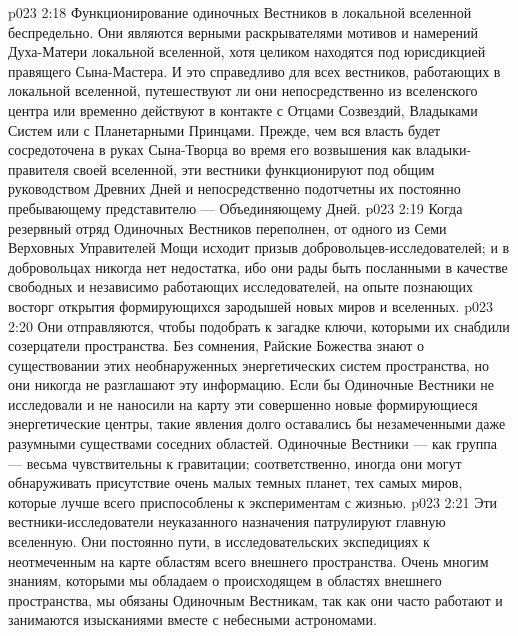 \vs p023 2:18 \bibnobreakspace {} Функционирование одиночных Вестников в локальной вселенной беспредельно. Они являются верными раскрывателями мотивов и намерений Духа\hyp{}Матери локальной вселенной, хотя целиком находятся под юрисдикцией правящего Сына\hyp{}Мастера. И это справедливо для всех вестников, работающих в локальной вселенной, путешествуют ли они непосредственно из вселенского центра или временно действуют в контакте с Отцами Созвездий, Владыками Систем или с Планетарными Принцами. Прежде, чем вся власть будет сосредоточена в руках Сына\hyp{}Творца во время его возвышения как владыки\hyp{}правителя своей вселенной, эти вестники функционируют под общим руководством Древних Дней и непосредственно подотчетны их постоянно пребывающему представителю --- Объединяющему Дней.
\vs p023 2:19 \bibnobreakspace {} Когда резервный отряд Одиночных Вестников переполнен, от одного из Семи Верховных Управителей Мощи исходит призыв добровольцев\hyp{}исследователей; и в добровольцах никогда нет недостатка, ибо они рады быть посланными в качестве свободных и независимо работающих исследователей, на опыте познающих восторг открытия формирующихся зародышей новых миров и вселенных.
\vs p023 2:20 Они отправляются, чтобы подобрать к загадке ключи, которыми их снабдили созерцатели пространства. Без сомнения, Райские Божества знают о существовании этих необнаруженных энергетических систем пространства, но они никогда не разглашают эту информацию. Если бы Одиночные Вестники не исследовали и не наносили на карту эти совершенно новые формирующиеся энергетические центры, такие явления долго оставались бы незамеченными даже разумными существами соседних областей. Одиночные Вестники --- как группа --- весьма чувствительны к гравитации; соответственно, иногда они могут обнаруживать присутствие очень малых темных планет, тех самых миров, которые лучше всего приспособлены к экспериментам с жизнью.
\vs p023 2:21 Эти вестники\hyp{}исследователи неуказанного назначения патрулируют главную вселенную. Они постоянно пути, в исследовательских экспедициях к неотмеченным на карте областям всего внешнего пространства. Очень многим знаниям, которыми мы обладаем о происходящем в областях внешнего пространства, мы обязаны Одиночным Вестникам, так как они часто работают и занимаются изысканиями вместе с небесными астрономами.
